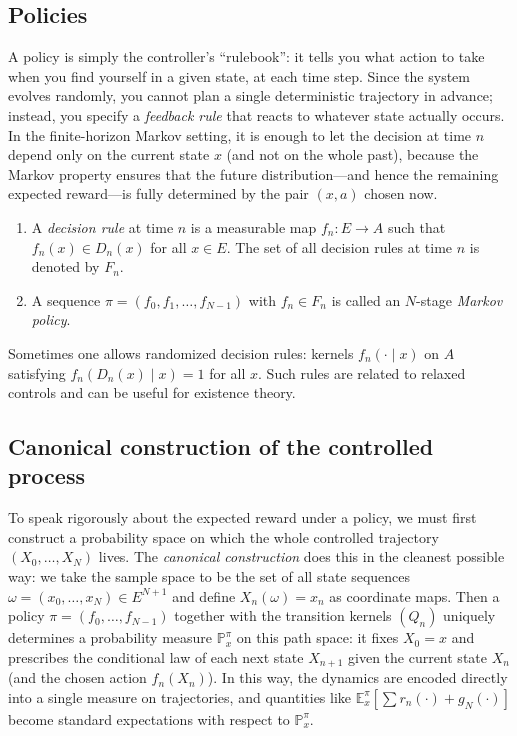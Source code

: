 \subsection{Policies}

A policy is simply the controller's ``rulebook'': it tells you what action to take when you find yourself in a given state, at each time step. Since the system evolves randomly, you cannot plan a single deterministic trajectory in advance; instead, you specify a \emph{feedback rule} that reacts to whatever state actually occurs. In the finite-horizon Markov setting, it is enough to let the decision at time $n$ depend only on the current state $x$ (and not on the whole past), because the Markov property ensures that the future distribution---and hence the remaining expected reward---is fully determined by the pair $(x,a)$ chosen now.


\begin{definition}
\leavevmode
\begin{enumerate}[label=(\alph*)]
  \item A \emph{decision rule} at time $n$ is a measurable map $f_n:E\to A$ such that $f_n(x)\in D_n(x)$ for all $x\in E$.
  The set of all decision rules at time $n$ is denoted by $F_n$.
  \item A sequence $\pi=(f_0,f_1,\dots,f_{N-1})$ with $f_n\in F_n$ is called an $N$-stage \emph{Markov policy}.
\end{enumerate}

\end{definition}

\begin{remark}
Sometimes one allows randomized decision rules: kernels $f_n(\cdot\mid x)$ on $A$ satisfying $f_n(D_n(x)\mid x)=1$ for all $x$.
Such rules are related to relaxed controls and can be useful for existence theory.
\end{remark}

\subsection{Canonical construction of the controlled process}
To speak rigorously about the expected reward under a policy, we must first construct a probability space on which the whole controlled trajectory $(X_0,\dots,X_N)$ lives. The \emph{canonical construction} does this in the cleanest possible way: we take the sample space to be the set of all state sequences $\omega=(x_0,\dots,x_N)\in E^{N+1}$ and define $X_n(\omega)=x_n$ as coordinate maps. Then a policy $\pi=(f_0,\dots,f_{N-1})$ together with the transition kernels $(Q_n)$ uniquely determines a probability measure $\mathbb{P}_x^\pi$ on this path space: it fixes $X_0=x$ and prescribes the conditional law of each next state $X_{n+1}$ given the current state $X_n$ (and the chosen action $f_n(X_n)$). In this way, the dynamics are encoded directly into a single measure on trajectories, and quantities like $\mathbb{E}_x^\pi[\sum r_n(\cdot)+g_N(\cdot)]$ become standard expectations with respect to $\mathbb{P}_x^\pi$.


